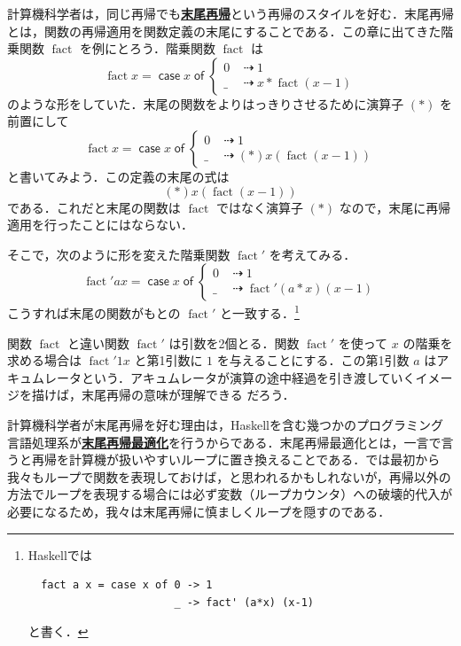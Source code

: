 \documentclass[a5paper,twoside,fleqn,draft]{jsbook}
\newcommand{\programminglanguage}[1]{\textsf{#1}}
\newcommand{\haskell}{\programminglanguage{Haskell}}
\newcommand{\keyword}[1]{{\underline{\textbf{#1}}}}
\newcommand{\mKeyword}[1]{\mathsf{#1}}
\newcommand{\mCaseKeyword}{\mKeyword{case}}
\newcommand{\mOfKeyword}{\mKeyword{of}}
\DeclareMathOperator{\mCaseKW}{\mCaseKeyword}
\DeclareMathOperator{\mOfKW}{\mOfKeyword}
\newcommand{\mSpecialFunc}[1]{\mathrm{#1}}
\DeclareMathOperator{\mFact}{\mSpecialFunc{fact}}
\DeclareMathOperator{\mIfSo}{\dashrightarrow}
\newcommand{\mCaseOf}[1]{\mCaseKW#1\mOfKW}
\begin{document}
計算機科学者は，同じ再帰でも\keyword{末尾再帰}という再帰のスタイルを好む．末尾再帰とは，関数の再帰適用を関数定義の末尾にすることである．この章に出てきた階乗関数 $\mFact$ を例にとろう．階乗関数 $\mFact$ は
\begin{equation}
  \mFact x
  =\mCaseOf{x}\begin{cases}
    0
    &\mIfSo1\\
    \_
    &\mIfSo x*\mFact(x-1)
  \end{cases}
\end{equation}
のような形をしていた．末尾の関数をよりはっきりさせるために演算子 $(*)$ を前置にして
\begin{equation}
  \mFact x
  =\mCaseOf{x}
  \begin{cases}
    0
    &\mIfSo1\\
    \_
    &\mIfSo(*)x(\mFact(x-1))
  \end{cases}
\end{equation}
と書いてみよう．この定義の末尾の式は
\begin{equation}
  (*)x(\mFact(x-1))
\end{equation}
である．これだと末尾の関数は $\mFact$ ではなく演算子 $(*)$ なので，末尾に再帰適用を行ったことにはならない．

そこで，次のように形を変えた階乗関数 $\mFact'$ を考えてみる．
\begin{equation}
  \mFact'ax
  =\mCaseOf{x}
  \begin{cases}
    0
    &\mIfSo1\\
    \_
    &\mIfSo\mFact'(a*x)(x-1)
  \end{cases}
\end{equation}
こうすれば末尾の関数がもとの $\mFact'$ と一致する．\footnote{\haskell では
\begin{verbatim}
  fact a x = case x of 0 -> 1
                       _ -> fact' (a*x) (x-1)
\end{verbatim}
と書く．}

関数 $\mFact$ と違い関数 $\mFact'$ は引数を2個とる．関数 $\mFact'$ を使って $x$ の階乗を求める場合は $\mFact'1x$ と第1引数に $1$ を与えることにする．この第1引数 $a$ はアキュムレータという．アキュムレータが演算の途中経過を引き渡していくイメージを描けば，末尾再帰の意味が理解できる
だろう．

計算機科学者が末尾再帰を好む理由は，\haskell を含む幾つかのプログラミング言語処理系が\keyword{末尾再帰最適化}を行うからである．末尾再帰最適化とは，一言で言うと再帰を計算機が扱いやすいループに置き換えることである．では最初から我々もループで関数を表現しておけば，と思われるかもしれないが，再帰以外の方法でループを表現する場合には必ず変数（ループカウンタ）への破壊的代入が必要になるため，我々は末尾再帰に慎ましくループを隠すのである．
\end{document}
